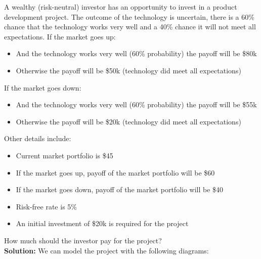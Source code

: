 \begin{example}

    A wealthy (risk-neutral) investor has an opportunity to invest in a product development project. The outcome of the technology is uncertain, there is a 60\% chance that the technology works very well and a 40\% chance it will not meet all expectations. If the market goes up:
    \begin{itemize}
        \item And the technology works very well (60\% probability) the payoff will be \$80k
        \item Otherwise the payoff will be \$50k (technology did meet all expectations)
    \end{itemize}
    If the market goes down:
    \begin{itemize}
        \item And the technology works very well (60\% probability) the payoff will be \$55k
        \item Otherwise the payoff will be \$20k (technology did meet all expectations)
    \end{itemize}
    Other details include:
    \begin{itemize}
        \item Current market portfolio is \$45
        \item If the market goes up, payoff of the market portfolio will be \$60
        \item If the market goes down, payoff of the market portfolio will be \$40
        \item Risk-free rate is 5\%
        \item An initial investment of \$20k is required for the project
    \end{itemize}
    How much should the investor pay for the project?\\

    \textbf{Solution:}
    We can model the project with the following diagrams:


\end{example}
